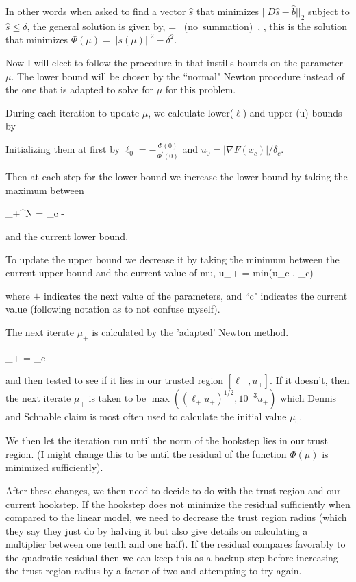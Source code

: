 In other words when asked to find a vector $\hat{s}$ that minimizes $||D
\hat{s} - \hat{b} ||_2 $ subject to $\hat{s} \leq \delta $, the general
solution is given by,
\beq \label{eqn:hookstep}
 =  \mbox{    (no summation)}
\,,
\eeq
\ie, this is the solution that minimizes $\Phi(\mu) = ||s(\mu)||^2 - \delta^2$.

Now I will elect to follow the procedure in  that instills bounds on the parameter $\mu$.
The lower bound will be chosen by the ``normal"
Newton procedure instead of the one that is adapted to solve for $\mu$ for this problem.

During each iteration to update $\mu$, we calculate lower($\ell$) and upper (u) bounds by

Initializing them at first by $\ell_0 =- \frac{\Phi(0)}{\Phi^{\prime}(0)}$ and $u_0= |\nabla F(x_c)|/\delta_c$.

Then at each step for the lower bound we increase the lower bound by taking the maximum between

\beq
\ell_{+}^N = \mu_c - 
\eeq

and the current lower bound.

To update the upper bound we decrease it by taking the minimum between the current upper bound and the
current value of mu,
\beq
u_{+} = min(u_c , \mu_c)
\eeq

where $+$ indicates the next value of the parameters, and ``c" indicates the current value (following
 notation as to not confuse myself).

The next iterate $\mu_{+}$ is calculated by the 'adapted' Newton method.

\beq
\mu_{+} = \mu_c -  
\eeq

and then tested to see if it lies in our trusted region $[\ell_{+}, u_{+}]$. If it doesn't,
then the next iterate $\mu_{+}$ is taken to be $\max ((\ell_{+} u_{+})^{1/2}, 10^{-3} u_{+})$
which Dennis and Schnable claim is most often used to calculate the initial value $\mu_0$.

We then let the iteration run until the norm of the hookstep lies in our trust region. (I might change
this to be until the residual of the function $\Phi (\mu)$ is minimized sufficiently).

After these changes, we then need to decide to do with the trust region and our current hookstep.
If the hookstep does not minimize the residual sufficiently when compared to the linear model,
we need to decrease the trust region radius (which they say they just do by halving it but also give
details on calculating a multiplier between one tenth and one half). If the residual compares
favorably to the quadratic residual then we can keep this as a backup step before increasing the
trust region radius by a factor of two and attempting to try again.

